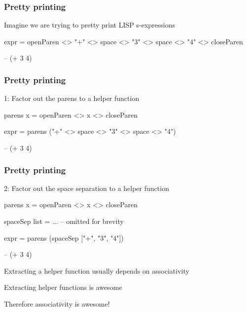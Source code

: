 \documentclass[UKenglish,usenames,dvipsnames,svgnames,table,aspectratio=169,mathserif]{beamer}
\newcommand{\textslide}[1]{{
\begin{frame}
\begin{center}

#1

\end{center}
\end{frame}
}}
\begin{document}
\begin{frame}[fragile]
\frametitle{Pretty printing}
\begin{center}
\begin{minipage}{0.6\textwidth}
Imagine we are trying to pretty print LISP s-expressions
\begin{haskellcode}




expr =
  openParen <> "+" <> space <> "3"
    <> space <> "4" <> closeParen

-- (+ 3 4)
\end{haskellcode}
\end{minipage}
\end{center}
\end{frame}


\begin{frame}[fragile]
\frametitle{Pretty printing}
\begin{center}
\begin{minipage}{0.6\textwidth}
1: Factor out the parens to a helper function

\begin{haskellcode}
parens x = openParen <> x <> closeParen



expr =
  parens ("+" <> space <> "3" <> space <> "4")


-- (+ 3 4)
\end{haskellcode}
\end{minipage}
\end{center}
\end{frame}


\begin{frame}[fragile]
\frametitle{Pretty printing}
\begin{center}
\begin{minipage}{0.6\textwidth}
2: Factor out the space separation to a helper function

\begin{haskellcode}
parens x = openParen <> x <> closeParen

spaceSep list = ... -- omitted for brevity

expr =
  parens (spaceSep ["+", "3", "4"])


-- (+ 3 4)
\end{haskellcode}
\end{minipage}
\end{center}
\end{frame}


\textslide{
Extracting a helper function usually depends on associativity

\medskip
Extracting helper functions is awesome

\medskip
Therefore associativity is awesome!
}
\end{document}
